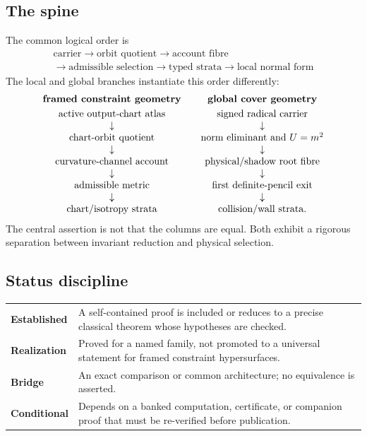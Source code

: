 \documentclass[11pt]{article}
\theoremstyle{remark}
\begin{document}
\subsection{The spine}

The common logical order is
\[
\boxed{\begin{gathered}
\text{carrier}\longrightarrow\text{orbit quotient}
\longrightarrow\text{account fibre}\\
\longrightarrow\text{admissible selection}
\longrightarrow\text{typed strata}
\longrightarrow\text{local normal form}
\end{gathered}}
\]
The local and global branches instantiate this order differently:
\[
\begin{array}{c@{\qquad}c}
\textbf{framed constraint geometry}&\textbf{global cover geometry}\\[1mm]
\text{active output-chart atlas}&\text{signed radical carrier}\\
\downarrow&\downarrow\\
\text{chart-orbit quotient}&\text{norm eliminant and }U=m^2\\
\downarrow&\downarrow\\
\text{curvature-channel account}&\text{physical/shadow root fibre}\\
\downarrow&\downarrow\\
\text{admissible metric}&\text{first definite-pencil exit}\\
\downarrow&\downarrow\\
\text{chart/isotropy strata}&\text{collision/wall strata}.
\end{array}
\]
The central assertion is not that the columns are equal. Both exhibit a
rigorous separation between invariant reduction and physical selection.

\subsection{Status discipline}

\begin{center}
\begin{tabular}{>{\bfseries}p{}p{}}
\toprule
Established & A self-contained proof is included or reduces to a precise
classical theorem whose hypotheses are checked.\\
Realization & Proved for a named family, not promoted to a universal statement
for framed constraint hypersurfaces.\\
Bridge & An exact comparison or common architecture; no equivalence is
asserted.\\
Conditional & Depends on a banked computation, certificate, or companion
proof that must be re-verified before publication.\\
\bottomrule
\end{tabular}
\end{center}
\end{document}
